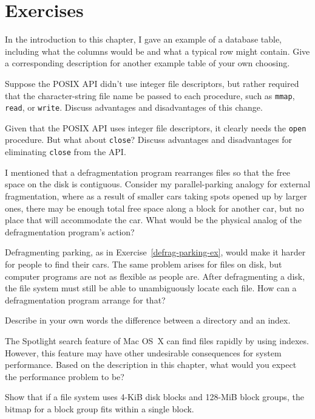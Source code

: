 \section*{Exercises}
\begin{chapterEnumerate}
\item In the introduction to this chapter, I gave an example of a
database table, including what the columns would be and what a typical
row might contain.  Give a corresponding description for another
example table of your own choosing.
\item Suppose the POSIX API didn't use integer file descriptors, but
rather required that the character-string file name be passed to each
procedure, such as \verb|mmap|, \verb|read|, or \verb|write|.  Discuss
advantages and disadvantages of this
change.
\item Given that the POSIX API uses integer file descriptors, it
clearly needs the \verb|open| procedure.   But what about
\verb|close|?  Discuss advantages and
disadvantages for eliminating \verb|close| from the API.
\item\label{defrag-parking-ex}
I mentioned that a defragmentation program rearranges files so that
the free space on the disk is contiguous.  Consider my
parallel-parking analogy for external fragmentation, where as a result
of smaller cars taking spots opened up by larger ones, there may
be enough total free space along a block for another car, but no place
that will accommodate the car.  What would be the physical analog of
the defragmentation program's action?
\item
Defragmenting parking, as in Exercise~\ref{defrag-parking-ex}, would
make it harder for people to find their cars.  The same problem arises
for files on disk, but computer programs are not as flexible as people are.
After defragmenting a disk, the file system must still be able to
unambiguously locate each
file.  How can a defragmentation program arrange for that?
\item
Describe in your own words the difference between a directory and an
index.
\item
The Spotlight search feature of Mac OS~X can find files rapidly by
using indexes.  However, this feature may have other undesirable
consequences for system performance.  Based on the description in this
chapter, what would you expect the performance problem to be?
\item\label{block-group-bitmap-exercise}
Show that if a file system uses 4-KiB disk blocks and 128-MiB block
groups, the bitmap for a block group fits within a single block.

\end{chapterEnumerate}
